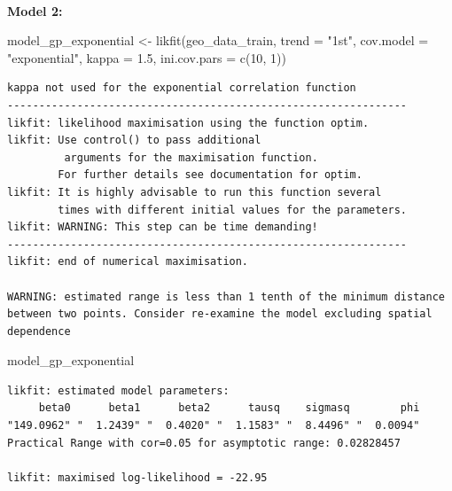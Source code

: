 \documentclass[
  11pt,
]{article}
\makeatletter
\let\oldparagraph\paragraph
\renewcommand{\paragraph}{
    \@ifstar
      \xxxParagraphStar
      \xxxParagraphNoStar
  }
\newcommand{\xxxParagraphStar}[1]{\oldparagraph*{#1}\mbox{}}
\newcommand{\xxxParagraphNoStar}[1]{\oldparagraph{#1}\mbox{}}
\newenvironment{Shaded}{\begin{snugshade}}{\end{snugshade}}
\newcommand{\AttributeTok}[1]{\textcolor[rgb]{0.40,0.45,0.13}{#1}}
\newcommand{\DecValTok}[1]{\textcolor[rgb]{0.68,0.00,0.00}{#1}}
\newcommand{\FloatTok}[1]{\textcolor[rgb]{0.68,0.00,0.00}{#1}}
\newcommand{\FunctionTok}[1]{\textcolor[rgb]{0.28,0.35,0.67}{#1}}
\newcommand{\NormalTok}[1]{\textcolor[rgb]{0.00,0.23,0.31}{#1}}
\newcommand{\OtherTok}[1]{\textcolor[rgb]{0.00,0.23,0.31}{#1}}
\newcommand{\StringTok}[1]{\textcolor[rgb]{0.13,0.47,0.30}{#1}}
\makeatother
\begin{document}
\paragraph{\texorpdfstring{\textbf{Model 2:}}{Model 2:}}\label{model-2}

\begin{Shaded}
\begin{Highlighting}[]
\NormalTok{model\_gp\_exponential }\OtherTok{\textless{}{-}} \FunctionTok{likfit}\NormalTok{(geo\_data\_train, }\AttributeTok{trend =} \StringTok{"1st"}\NormalTok{, }\AttributeTok{cov.model =} \StringTok{"exponential"}\NormalTok{, }\AttributeTok{kappa =} \FloatTok{1.5}\NormalTok{, }\AttributeTok{ini.cov.pars =} \FunctionTok{c}\NormalTok{(}\DecValTok{10}\NormalTok{, }\DecValTok{1}\NormalTok{))}
\end{Highlighting}
\end{Shaded}

\begin{verbatim}
kappa not used for the exponential correlation function
---------------------------------------------------------------
likfit: likelihood maximisation using the function optim.
likfit: Use control() to pass additional
         arguments for the maximisation function.
        For further details see documentation for optim.
likfit: It is highly advisable to run this function several
        times with different initial values for the parameters.
likfit: WARNING: This step can be time demanding!
---------------------------------------------------------------
likfit: end of numerical maximisation.

WARNING: estimated range is less than 1 tenth of the minimum distance between two points. Consider re-examine the model excluding spatial dependence
\end{verbatim}

\begin{Shaded}
\begin{Highlighting}[]
\NormalTok{model\_gp\_exponential}
\end{Highlighting}
\end{Shaded}

\begin{verbatim}
likfit: estimated model parameters:
     beta0      beta1      beta2      tausq    sigmasq        phi 
"149.0962" "  1.2439" "  0.4020" "  1.1583" "  8.4496" "  0.0094" 
Practical Range with cor=0.05 for asymptotic range: 0.02828457

likfit: maximised log-likelihood = -22.95
\end{verbatim}
\end{document}
